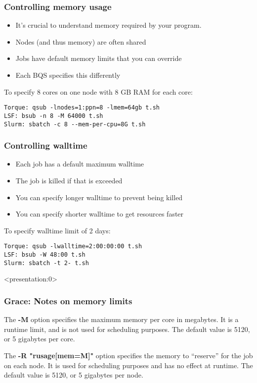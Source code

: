 \documentclass[10pt]{beamer}
\begin{document}
\begin{frame}[fragile]
\frametitle{Controlling memory usage}
\begin{itemize}
\item It's crucial to understand memory required by your program.
\item Nodes (and thus memory) are often shared
\item Jobs have default memory limits that you can override
\item Each BQS specifies this differently
\end{itemize}

To specify 8 cores on one node with 8 GB RAM for each core:
\begin{verbatim}
Torque: qsub -lnodes=1:ppn=8 -lmem=64gb t.sh
LSF: bsub -n 8 -M 64000 t.sh
Slurm: sbatch -c 8 --mem-per-cpu=8G t.sh

\end{verbatim}
\end{frame}

\begin{frame}[fragile]
\frametitle{Controlling walltime}
\begin{itemize}
\item Each job has a default maximum walltime
\item The job is killed if that is exceeded
\item You can specify longer walltime to prevent being killed
\item You can specify shorter walltime to get resources faster
\end{itemize}

To specify walltime limit of 2 days:
\begin{verbatim}
Torque: qsub -lwalltime=2:00:00:00 t.sh
LSF: bsub -W 48:00 t.sh
Slurm: sbatch -t 2- t.sh

\end{verbatim}
\end{frame}

\begin{frame}<presentation:0>
\frametitle{Grace: Notes on memory limits}
The \textbf{-M} option specifies the maximum memory per core in
megabytes.
It is a runtime limit, and is not used for scheduling purposes.
The default value is 5120, or 5 gigabytes per core.

\vskip10pt
The \textbf{-R "rusage[mem=M]"} option specifies the memory to ``reserve''
for the job on each node. It is used for scheduling purposes and has no
effect at runtime.
The default value is 5120, or 5 gigabytes per node.
\end{frame}
\end{document}
